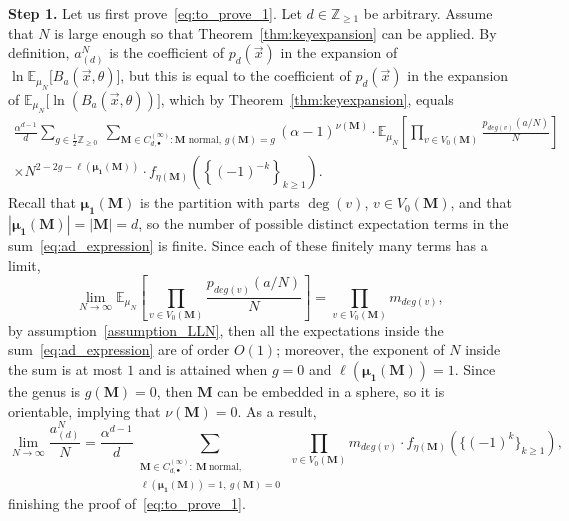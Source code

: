 \documentclass[11pt]{article}
\theoremstyle{plain}
\newcommand{\Z}{\mathbb Z}
\newcommand{\E}{\mathbb E}
\newcommand{\MM}{\mathbf M}
\newcommand{\vecx}{\vec{x}}
\begin{document}
\textbf{Step 1.} Let us first prove~\eqref{eq:to_prove_1}. Let $d\in\Z_{\ge 1}$ be arbitrary.
Assume that $N$ is large enough so that Theorem~\ref{thm:keyexpansion} can be applied.
By definition, $a^N_{(d)}$ is the coefficient of $p_d(\vecx)$ in the expansion of $\ln\E_{\mu_N}\big[B_a(\vecx,\theta)\big]$, but this is equal to the coefficient of $p_d(\vecx)$ in the expansion of $\E_{\mu_N}\big[\ln(B_a(\vecx,\theta))\big]$, which by Theorem~\ref{thm:keyexpansion}, equals
    \begin{multline}\label{eq:ad_expression}
       \frac{\alpha^{d-1}}{d}\sum_{g\in \frac{1}{2}\Z_{\ge 0}}\ \sum_{\MM\in C^{(\infty)}_{d,\bullet}\colon \MM\text{ normal},\, g(\MM)=g}
   (\alpha-1)^{\nu(\MM)}\cdot\E_{\mu_N}\left[\prod_{v\in V_{0}(\MM)}\frac{p_{deg(v)}(a/N)}{N}\right]\\
       \times N^{ 2-2g-\ell(\pmb{\mu_{1}(\MM)})}\cdot f_{\eta(\MM)}\left(\left\{\left(-1\right)^{-k}\right\}_{k\ge 1}\right).
    \end{multline}
   Recall that $\pmb{\mu_1}(\MM)$ is the partition with parts $\deg(v)$, $v\in V_0(\MM)$, and that $|\pmb{\mu_1}(\MM)|=|\MM|=d$, so the number of possible distinct expectation terms in the sum~\eqref{eq:ad_expression} is finite.
   Since each of these finitely many terms has a limit,
   \[
   \lim_{N\to\infty}{\E_{\mu_N}\left[\prod_{v\in V_0(\MM)} \frac{p_{deg(v)}(a/N)}{N}\right]} = \prod_{v\in V_{0}(\MM)}m_{deg(v)},
   \]
   by assumption~\eqref{assumption_LLN}, then all the expectations inside the sum~\eqref{eq:ad_expression} are of order $O(1)$; moreover, the exponent of $N$ inside the sum is at most $1$ and is attained when $g=0$ and $\ell(\pmb{\mu_1}(\MM))=1$.
   Since the genus is $g(\MM)=0$, then $\MM$ can be embedded in a sphere, so it is orientable, implying that $\nu(\MM)=0$. As a result,
   \begin{equation}\label{eq_freecumulant1}
        \lim_{N\rightarrow\infty}\frac{a^{N}_{(d)}}{N} = \frac{\alpha^{d-1}}{d}\sum_{\substack{\MM\in C^{(\infty)}_{d,\bullet}: \ \MM\ \text{normal},\\ \ell(\pmb{\mu_{1}}(\MM))=1,\ g(\MM)=0}}\ \prod_{v\in V_{0}(\MM)}{m_{deg(v)}}\cdot f_{\eta(\MM)}\left(\{(-1)^{k}\}_{k\ge 1}\right),
    \end{equation}
finishing the proof of~\eqref{eq:to_prove_1}.

\bigskip
 
\end{document}
